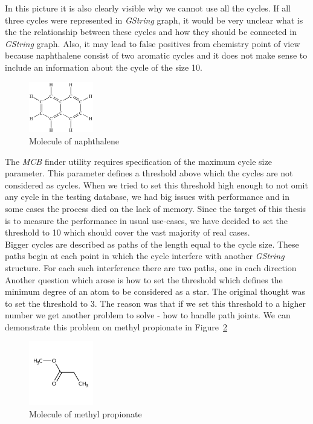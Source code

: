 {In this picture it is also clearly visible why we cannot use all the cycles. If all three cycles were represented in \textit{GString} graph, it would be very unclear what is the the relationship between these cycles and how they should be connected in \textit{GString} graph. Also, it may lead to false positives from chemistry point of view because naphthalene consist of two aromatic cycles and it does not make sense to include an information about the cycle of the size 10.\\

\begin{figure}[h]
	\centering
	\includegraphics[width=0.25\textwidth]{../img/naphthalene01.png}
	\caption{Molecule of naphthalene}
	\label{fig:naphthalene}
\end{figure}

The \textit{MCB} finder utility requires specification of the maximum cycle size parameter. This parameter defines a threshold above which the cycles are not considered as cycles. When we tried to set this threshold high enough to not omit any cycle in the testing database, we had big issues with performance and in some cases the process died on the lack of memory. Since the target of this thesis is to measure the performance in usual use-cases, we have decided to set the threshold to 10 which should cover the vast majority of real cases.\\

Bigger cycles are described as paths of the length equal to the cycle size. These paths begin at each point in which the cycle interfere with another \textit{GString} structure. For each such interference there are two paths, one in each direction\\

Another question which arose is how to set the threshold which defines the minimum degree of an atom to be considered as a star. The original thought was to set the threshold to 3. The reason was that if we set this threshold to a higher number we get another problem to solve - how to handle path joints. We can demonstrate this problem on methyl propionate in Figure~\ref{fig:methyl-propionate}\\

\begin{figure}[h]
	\centering
	\includegraphics[width=0.25\textwidth]{../img/methyl-propionate.jpg}
	\caption{Molecule of methyl propionate}
	\label{fig:methyl-propionate}
\end{figure}

}
